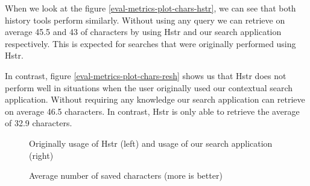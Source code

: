 When we look at the figure \ref{eval-metrics-plot-chars-hstr}, we can see that both history tools perform similarly. Without using any query we can retrieve on average 45.5 and 43 of characters by using Hstr and our search application respectively. This is expected for searches that were originally performed using Hstr.

In contrast, figure \ref{eval-metrics-plot-chars-resh} shows us that Hstr does not perform well in situations when the user originally used our contextual search application. Without requiring any knowledge our search application can retrieve on average 46.5 characters. In contrast, Hstr is only able to retrieve the average of 32.9 characters.





\begin{figure}
\centering
{}\hfill
{}
\caption{Average number of saved characters (more is better)}
\small{Originally usage of Hstr (left) and usage of our search application (right)}
\label{eval-metrics-plot-chars}
\end{figure}

